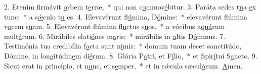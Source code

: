 2. Etenim firmávit \uline{o}rbem t\uline{e}rræ,~* qui non c\uline{o}mmov\uline{é}bitur.
3. Paráta sedes t\uline{u}a \uline{e}x tunc:~* a s\uline{ǽ}culo t\uline{u} es.
4. Elevavérunt fl\uline{ú}mina, D\uline{ó}mine:~* elevavérunt flúmina v\uline{o}cem s\uline{u}am.
5. Elevavérunt flúmina fl\uline{u}ctus s\uline{u}os,~* a vócibus a\uline{quá}rum mult\uline{á}rum.
6. Mirábiles elati\uline{ó}nes m\uline{a}ris:~* mirábilis in \uline{a}ltis D\uline{ó}minus.
7. Testimónia tua credibília f\uline{a}cta sunt n\uline{i}mis:~* domum tuam decet sanctitúdo, Dómine, in longitúdin\uline{e}m di\uline{é}rum.
8. Glória P\uline{a}tri, et F\uline{í}lio,~* et Spir\uline{í}tui S\uline{a}ncto.
9. Sicut erat in princípio, et n\uline{u}nc, et s\uline{e}mper,~* et in sǽcula sæcul\uline{ó}rum. \uline{A}men.
